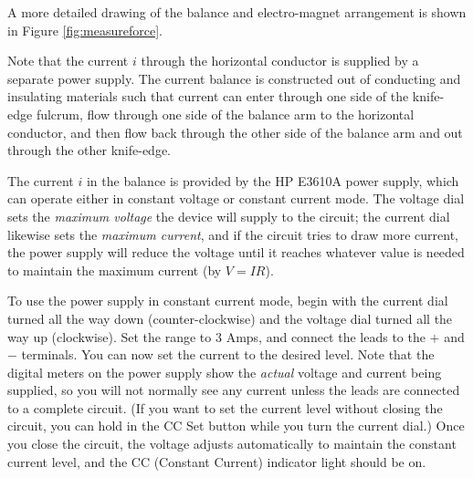 A more detailed drawing of the balance and electro-magnet arrangement is shown in Figure {\ref{fig:measureforce}}.


Note that the current $i$ through the horizontal conductor is supplied by a separate power supply. The current balance is constructed out of conducting and insulating materials such that current can enter through one side of the knife-edge fulcrum, flow through one side of the balance arm to the horizontal conductor, and then flow back through the other side of the balance arm and out through the other knife-edge. \myskip

The current $i$ in the balance is provided by the HP E3610A power supply, which can operate either in constant voltage or constant current mode. The voltage dial sets the \emph{maximum voltage} the device will supply to the circuit; the current dial likewise sets the \emph{maximum current}, and if the circuit tries to draw more current, the power supply will reduce the voltage until it reaches whatever value is needed to maintain the maximum current (by $V = IR$). \myskip

To use the power supply in constant current mode, begin with the current dial turned all the way down (counter-clockwise) and the voltage dial turned all the way up (clockwise). Set the range to 3 Amps, and connect the leads to the $+$ and $-$ terminals. You can now set the current to the desired level. Note that the digital meters on the power supply show the \emph{actual} voltage and current being supplied, so you will not normally see any current unless the leads are connected to a complete circuit. (If you want to set the current level without closing the circuit, you can hold in the CC Set button while you turn the current dial.) Once you close the circuit, the voltage adjusts automatically to maintain the constant current level, and the CC (Constant Current) indicator light should be on.

